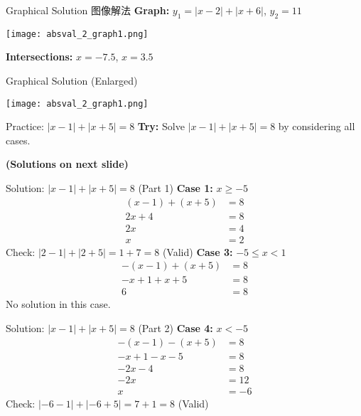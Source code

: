 \documentclass[aspectratio=169]{beamer}
\begin{document}
\begin{frame}{Graphical Solution 图像解法}
    \footnotesize
    \textbf{Graph:} $y_1 = |x-2| + |x+6|$, $y_2 = 11$
    \begin{center}
        \texttt{[image: absval\_2\_graph1.png]}
    \end{center}
    \textbf{Intersections:} $x = -7.5$, $x = 3.5$
\end{frame}

\begin{frame}{Graphical Solution (Enlarged)}
    \begin{center}
        \texttt{[image: absval\_2\_graph1.png]}
    \end{center}
\end{frame}

\begin{frame}{Practice: $|x-1| + |x+5| = 8$}
    \footnotesize
    \textbf{Try:} Solve $|x-1| + |x+5| = 8$ by considering all cases.\par
    \textbf{(Solutions on next slide)}
\end{frame}

\begin{frame}{Solution: $|x-1| + |x+5| = 8$ (Part 1)}
    \footnotesize
    \textbf{Case 1:} $x \geq -5$
    \begin{align*}
        (x-1) + (x+5) &= 8 \\
        2x + 4 &= 8 \\
        2x &= 4 \\
        x &= 2
    \end{align*}
    Check: $|2-1| + |2+5| = 1 + 7 = 8$ (Valid)
    \vspace{1em}
    \textbf{Case 3:} $-5 \leq x < 1$
    \begin{align*}
        -(x-1) + (x+5) &= 8 \\
        -x+1+x+5 &= 8 \\
        6 &= 8
    \end{align*}
    No solution in this case.
\end{frame}

\begin{frame}{Solution: $|x-1| + |x+5| = 8$ (Part 2)}
    \footnotesize
    \textbf{Case 4:} $x < -5$
    \begin{align*}
        -(x-1) - (x+5) &= 8 \\
        -x+1-x-5 &= 8 \\
        -2x-4 &= 8 \\
        -2x &= 12 \\
        x &= -6
    \end{align*}
    Check: $|-6-1| + |-6+5| = 7 + 1 = 8$ (Valid)
\end{frame}
\end{document}
